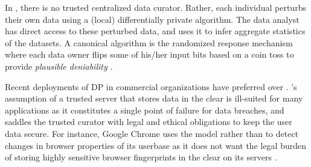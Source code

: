 
In \ldp, there is no trusted centralized data curator. Rather, each individual perturbs their own data using a (local) differentially private algorithm. The data analyst has direct access to these perturbed data, and uses it to infer aggregate statistics of the datasets. A canonical \ldp algorithm is the randomized response mechanism \cite{RR} where each data owner flips some of his/her input bits based on a coin toss to provide \emph{plausible deniability} \cite{Dork}.


Recent deployments of DP in commercial organizations \cite{Rappor1, Apple} have preferred  \ldp over \cdp. \cdp's assumption of a trusted server that stores data in the clear is ill-suited for many applications as it constitutes a single point of failure for data breaches, and saddles the trusted curator with legal and ethical obligations to keep the user data secure. For instance, Google Chrome uses the \ldp model rather than \cdp to detect changes in browser properties of its userbase as it does not want the legal burden of storing highly sensitive browser fingerprints in the clear on its servers \cite{Rappor1}. 
  

